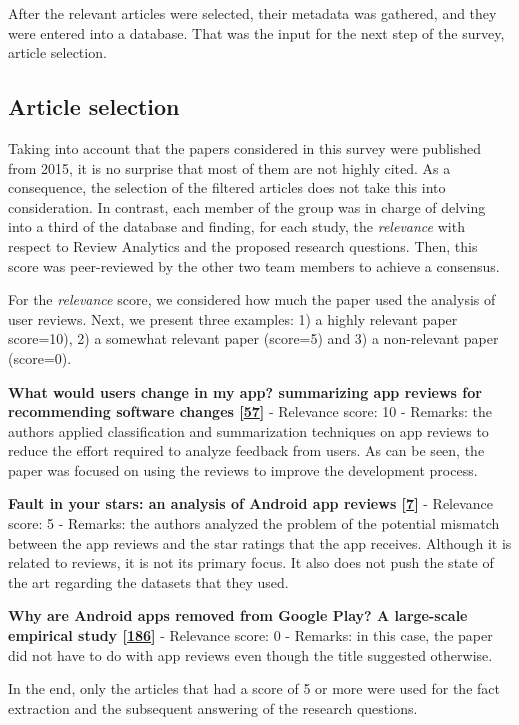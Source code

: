 \documentclass[]{book}
\begin{document}
After the relevant articles were selected, their metadata was gathered,
and they were entered into a database. That was the input for the next
step of the survey, article selection.

\subsection{Article selection}\label{article-selection}

Taking into account that the papers considered in this survey were
published from 2015, it is no surprise that most of them are not highly
cited. As a consequence, the selection of the filtered articles does not
take this into consideration. In contrast, each member of the group was
in charge of delving into a third of the database and finding, for each
study, the \emph{relevance} with respect to Review Analytics and the
proposed research questions. Then, this score was peer-reviewed by the
other two team members to achieve a consensus.

For the \emph{relevance} score, we considered how much the paper used
the analysis of user reviews. Next, we present three examples: 1) a
highly relevant paper score=10), 2) a somewhat relevant paper (score=5)
and 3) a non-relevant paper (score=0).

\textbf{What would users change in my app? summarizing app reviews for
recommending software changes
{[}\protect\hyperlink{ref-di2016would}{57}{]}} - Relevance score: 10 -
Remarks: the authors applied classification and summarization techniques
on app reviews to reduce the effort required to analyze feedback from
users. As can be seen, the paper was focused on using the reviews to
improve the development process.

\textbf{Fault in your stars: an analysis of Android app reviews
{[}\protect\hyperlink{ref-aralikatte2018fault}{7}{]}} - Relevance score:
5 - Remarks: the authors analyzed the problem of the potential mismatch
between the app reviews and the star ratings that the app receives.
Although it is related to reviews, it is not its primary focus. It also
does not push the state of the art regarding the datasets that they
used.

\textbf{Why are Android apps removed from Google Play? A large-scale
empirical study {[}\protect\hyperlink{ref-wang2018android}{186}{]}} -
Relevance score: 0 - Remarks: in this case, the paper did not have to do
with app reviews even though the title suggested otherwise.

In the end, only the articles that had a score of 5 or more were used
for the fact extraction and the subsequent answering of the research
questions.
\end{document}
